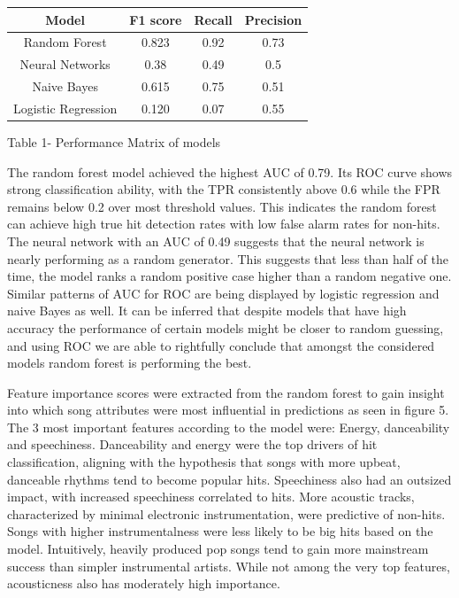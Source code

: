 \documentclass{article}
\begin{document}
\begin{center}
\centering
  \begin{tabular}{|c|c|c|c|} \hline
    Model& F1 score & Recall & Precision \\ \hline
    Random Forest& 0.823& 0.92& 0.73\\
    Neural Networks& 0.38& 0.49& 0.5\\
    Naive Bayes& 0.615& 0.75& 0.51\\
    Logistic Regression & 0.120& 0.07& 0.55\\ \hline
  \end{tabular}
\end{center}
\begin{center}
    \footnotesize{Table 1- Performance Matrix of models}
\end{center}

The random forest model achieved the highest AUC of 0.79. Its ROC curve shows strong classification ability, with the TPR consistently above 0.6 while the FPR remains below 0.2 over most threshold values. This indicates the random forest can achieve high true hit detection rates with low false alarm rates for non-hits. The neural network with an AUC of 0.49 suggests that the neural network is nearly performing as a random generator. This suggests that less than half of the time, the model ranks a random positive case higher than a random negative one. Similar patterns of AUC for ROC are being displayed by logistic regression and naive Bayes as well. It can be inferred that despite models that have high accuracy the performance of certain models might be closer to random guessing, and using ROC we are able to rightfully conclude that amongst the considered models random forest is performing the best.

Feature importance scores were extracted from the random forest to gain insight into which song attributes were most influential in predictions as seen in figure 5. The 3 most important features according to the model were: Energy, danceability and speechiness. Danceability and energy were the top drivers of hit classification, aligning with the hypothesis that songs with more upbeat, danceable rhythms tend to become popular hits. Speechiness also had an outsized impact, with increased speechiness correlated to hits. More acoustic tracks, characterized by minimal electronic instrumentation, were predictive of non-hits. Songs with higher instrumentalness were less likely to be big hits based on the model. Intuitively, heavily produced pop songs tend to gain more mainstream success than simpler instrumental artists. While not among the very top features, acousticness also has moderately high importance.
\end{document}
